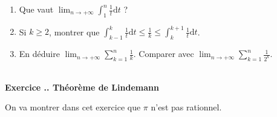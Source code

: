 \documentclass{article}
\newcommand{\di}{\mathrm{d}}
\newcounter{exo}
\newcommand{\exercice}[1][\null]{\textbf{\\ Exercice \thesection.\theexo. #1} \addtocounter{exo}{1}}
\begin{document}
\begin{enumerate}

\item Que vaut $\displaystyle \lim_{n \rightarrow + \infty} \int_1^{n} \frac{1}{t} \di  t$ ?

\item Si $k \ge 2$, montrer que $ \displaystyle \int_{k-1}^{k} \frac{1}{t} \di  t \le \frac{1}{k} \le \int_{k}^{k+1} \frac{1}{t} \di  t$.

\item En déduire $\displaystyle  \lim_{n \rightarrow + \infty} \sum_{k = 1}^{n} \frac{1}{k}$. Comparer avec $\displaystyle  \lim_{n \rightarrow + \infty} \sum_{k = 1}^{n} \frac{1}{2^k}$.
\end{enumerate}

\exercice[Théorème de Lindemann]

On va montrer dans cet exercice que $\pi$ n'est pas rationnel.
\end{document}

